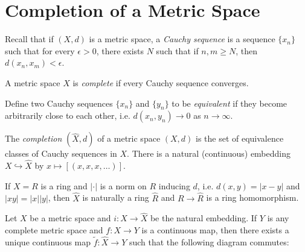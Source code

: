 \section{Completion of a Metric Space}

\begin{remark}
  Recall that if $(X, d)$ is a metric space, a
  \emph{Cauchy sequence} is a sequence $\{x_n\}$
  such that for every $\epsilon > 0$, there exists
  $N$ such that if $n, m \ge N$, then
  $d(x_n, x_m) < \epsilon$.
\end{remark}

\begin{definition}
  A metric space $X$ is \emph{complete} if every
  Cauchy sequence converges.
\end{definition}

\begin{definition}
  Define two Cauchy sequences $\{x_n\}$ and $\{y_n\}$
  to be \emph{equivalent} if they become arbitrarily
  close to each other, i.e.
  $d(x_n, y_n) \to 0$ as $n \to \infty$.
\end{definition}

\begin{definition}
  The \emph{completion} $(\widehat{X}, d)$
  of a metric space $(X, d)$ is the set of
  equivalence classes of Cauchy sequences in $X$.
  There is a natural (continuous)
  embedding $X \hookrightarrow \widehat{X}$ by
  $x \mapsto [(x, x, x, \dots)]$.
\end{definition}

\begin{prop}
  If $X = R$ is a ring and
  $|\cdot|$ is a norm on $R$ inducing $d$,
  i.e. $d(x, y) = |x - y|$ and $|xy| = |x| |y|$, then
  $\widehat{X}$ is naturally a ring $\widehat{R}$
  and $R \to \widehat{R}$ is a ring homomorphism.
\end{prop}

\begin{prop}
  Let $X$ be a metric space and $i : X \to \widehat{X}$
  be the natural embedding. If $Y$ is any complete
  metric space and $f : X \to Y$ is a continuous map,
  then there exists a unique continuous map
  $\widetilde{f} : \widehat{X} \to Y$ such that
  the following diagram commutes:
  \begin{center}
  \end{center}
\end{prop}

